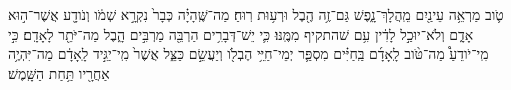 \documentclass{openreader}
\begin{document}
טֹ֛וב מַרְאֵ֥ה עֵינַ֖יִם מֵֽהֲלָךְ־נָ֑פֶשׁ גַּם־זֶ֥ה הֶ֖בֶל וּרְע֥וּת רֽוּחַ׃ 
מַה־שֶּֽׁהָיָ֗ה כְּבָר֙ נִקְרָ֣א שְׁמֹ֔ו וְנֹודָ֖ע אֲשֶׁר־ה֣וּא אָדָ֑ם וְלֹא־יוּכַ֣ל לָדִ֔ין עִ֥ם שׁהתקיף מִמֶּֽנּוּ׃ 
כִּ֛י יֵשׁ־דְּבָרִ֥ים הַרְבֵּ֖ה מַרְבִּ֣ים הָ֑בֶל מַה־יֹּתֵ֖ר לָאָדָֽם׃ 
כִּ֣י מִֽי־יֹודֵעַ֩ מַה־טֹּ֨וב לָֽאָדָ֜ם בַּֽחַיִּ֗ים מִסְפַּ֛ר יְמֵי־חַיֵּ֥י הֶבְלֹ֖ו וְיַעֲשֵׂ֣ם כַּצֵּ֑ל אֲשֶׁר֙ מִֽי־יַגִּ֣יד לָֽאָדָ֔ם מַה־יִּהְיֶ֥ה אַחֲרָ֖יו תַּ֥חַת הַשָּֽׁמֶשׁ׃ 
\end{document}
